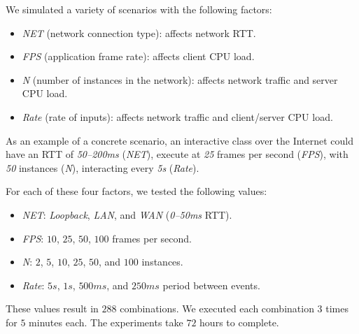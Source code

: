\documentclass[sigplan,screen]{acmart}
\begin{document}
We simulated a variety of scenarios with the following factors:
%
\begin{itemize}
\item \emph{NET} (network connection type):
    affects network RTT.
\item \emph{FPS} (application frame rate):
    affects client CPU load.
\item \emph{N} (number of instances in the network):
    affects network traffic and server CPU load.
\item \emph{Rate} (rate of inputs):
    affects network traffic and client/server CPU load.
\end{itemize}
%

As an example of a concrete scenario, an interactive class over the Internet
could have
    an RTT of \emph{50--200ms} (\emph{NET}),
    execute at \emph{25} frames per second (\emph{FPS}),
    with \emph{50} instances (\emph{N}),
    interacting every \emph{5s} (\emph{Rate}).

For each of these four factors, we tested the following values:
%
\begin{itemize}
\item \emph{NET}: \emph{Loopback}, \emph{LAN}, and \emph{WAN} (\emph{0--50ms} RTT).
\item \emph{FPS}: $10$, $25$, $50$, $100$ frames per second.     %
\item \emph{N}: $2$, $5$, $10$, $25$, $50$, and $100$ instances. %
\item \emph{Rate}: $5s$, $1s$, $500ms$, and $250ms$ period between events.
\end{itemize}                                                    %
%
These values result in $288$ combinations.
We executed each combination $3$ times for $5$ minutes each.
The experiments take $72$ hours to complete.
\end{document}
